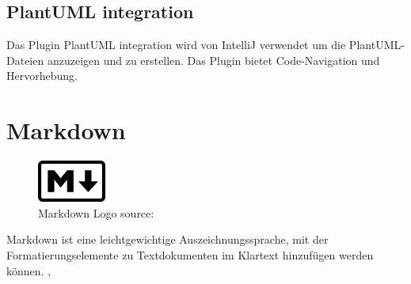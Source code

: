 \subsection{PlantUML integration}
Das Plugin PlantUML integration wird von IntelliJ verwendet um die PlantUML-Dateien anzuzeigen und zu erstellen.
Das Plugin bietet Code-Navigation und Hervorhebung. \cite{noauthor_plantuml_nodate}

\section{Markdown}
\label{chap:markdown}
\begin{figure}[!htb]
        \includegraphics[width=0.2\textwidth]{pics/MarkdownLogo.png}
        \centering
        \caption{Markdown Logo 
        source: \cite{noauthor_markdown_2021} }
\end{figure}

Markdown ist eine leichtgewichtige Auszeichnungssprache, mit der 
Formatierungselemente zu Textdokumenten im Klartext hinzufügen werden können. \cite{noauthor_markdown_2021}, \cite{noauthor_markdown_nodate}

